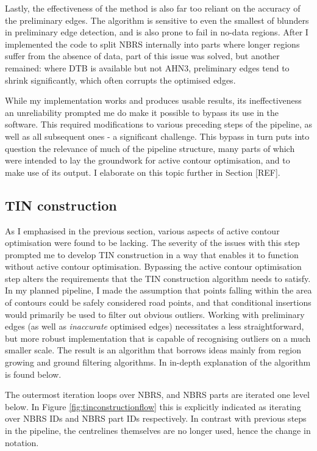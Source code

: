 Lastly, the effectiveness of the method is also far too reliant on the accuracy of the preliminary edges. The algorithm is sensitive to even the smallest of blunders in preliminary edge detection, and is also prone to fail in no-data regions. After I implemented the code to split NBRS internally into parts where longer regions suffer from the absence of data, part of this issue was solved, but another remained: where DTB is available but not AHN3, preliminary edges tend to shrink significantly, which often corrupts the optimised edges.

While my implementation works and produces usable results, its ineffectiveness an unreliability prompted me do make it possible to bypass its use in the software. This required modifications to various preceding steps of the pipeline, as well as all subsequent ones - a significant challenge. This bypass in turn puts into question the relevance of much of the pipeline structure, many parts of which were intended to lay the groundwork for active contour optimisation, and to make use of its output. I elaborate on this topic further in Section [REF].

\subsection{TIN construction}
\label{sub:m_tinconstruction}

As I emphasised in the previous section, various aspects of active contour optimisation were found to be lacking. The severity of the issues with this step prompted me to develop TIN construction in a way that enables it to function without active contour optimisation. Bypassing  the active contour optimisation step alters the requirements that the TIN construction algorithm needs to satisfy. In my planned pipeline, I made the assumption that points falling within the area of contours could be safely considered road points, and that conditional insertions would primarily be used to filter out obvious outliers. Working with preliminary edges (as well as \textit{inaccurate} optimised edges) necessitates a less straightforward, but more robust implementation that is capable of recognising outliers on a much smaller scale. The result is an algorithm that borrows ideas mainly from region growing and ground filtering algorithms. In in-depth explanation of the algorithm is found below.

The outermost iteration loops over NBRS, and NBRS parts are iterated one level below. In Figure \ref{fig:tinconstructionflow} this is explicitly indicated as iterating over NBRS IDs and NBRS part IDs respectively. In contrast with previous steps in the pipeline, the centrelines themselves are no longer used, hence the change in notation. 

